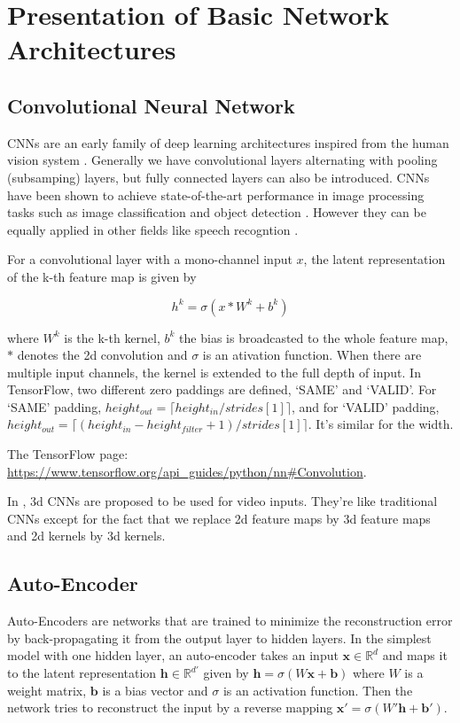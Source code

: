 \section{Presentation of Basic Network Architectures}
\label{section:networks}

\subsection{Convolutional Neural Network}

CNNs are an early family of deep learning
architectures inspired from the human vision system \cite{Y. LeCun 1998}.
Generally we have convolutional layers alternating with pooling
(subsamping) layers, but fully connected layers can also be introduced.
CNNs have been shown to achieve state-of-the-art performance in
image processing tasks such as image classification
\cite{A. Krizhevsky 2012} and object detection \cite{Y. LeCun 2010}.
However they can be equally applied in other fields like speech recogntion
\cite{L. Deng 2013}.

For a convolutional layer with a mono-channel input $x$, the latent
representation of the k-th feature map is given by

\[h^k = \sigma(x\ast W^k + b^k)\]

where $W^k$ is the k-th kernel, $b^k$ the bias is broadcasted to the whole
feature map, $\ast$ denotes the 2d convolution and $\sigma$ is an
ativation function. When there are multiple input channels, the kernel
is extended to the full depth of input. In TensorFlow, two different
zero paddings are defined, `SAME' and `VALID'. For `SAME' padding,
$height_{out} = \lceil height_{in}/strides[1] \rceil$,
and for `VALID' padding,
$height_{out} = \lceil (height_{in}-height_{filter}+1)/strides[1] \rceil$.
It's similar for the width.

The TensorFlow page: 
\href{https://www.tensorflow.org/api_guides/python/nn#Convolution}
{https://www.tensorflow.org/api\_guides/python/nn\#Convolution}.

In \cite{S. Ji 2013}, 3d CNNs are proposed to be used for video inputs.
They're like traditional CNNs except for the fact that we replace
2d feature maps by 3d feature maps and 2d kernels by 3d kernels.

\subsection{Auto-Encoder} \label{subsection:AE}

Auto-Encoders are networks that are trained to minimize the reconstruction
error by back-propagating it from the output layer to hidden layers.
In the simplest model with one hidden layer, an auto-encoder takes an
input $\mathbf{x} \in \mathbb{R}^d$ and maps it to the latent
representation $\mathbf{h} \in \mathbb{R}^{d'}$ given by
$\mathbf{h} = \sigma(W\mathbf{x}+\mathbf{b})$ where $W$
is a weight matrix, $\mathbf{b}$ is a bias vector and $\sigma$ is an
activation function. Then the network tries to reconstruct the input
by a reverse mapping $\mathbf{x'} = \sigma(W'\mathbf{h}+\mathbf{b'})$.


